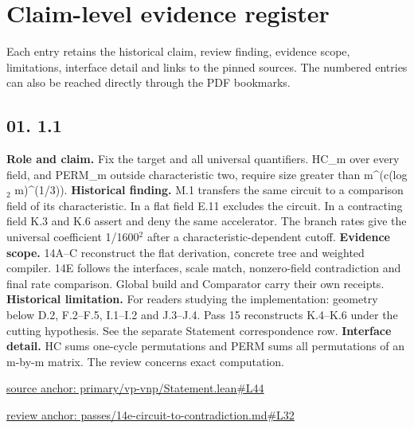 \documentclass[11pt,letterpaper]{article}
\theoremstyle{definition}\newtheorem{definition}[theorem]{Definition}\newtheorem{example}[theorem]{Example}
\theoremstyle{remark}\newtheorem{remark}[theorem]{Remark}
\begin{document}
\section*{Claim-level evidence register}
\noindent Each entry retains the historical claim, review finding, evidence scope, limitations, interface detail and links to the pinned sources. The numbered entries can also be reached directly through the PDF bookmarks.\par\medskip
\goodbreak
{}
\hypertarget{claim.01}{}
\subsection*{01. 1.1}
\textbf{Role and claim.} Fix the target and all universal quantifiers. HC\_m over every field, and PERM\_m outside characteristic two, require size greater than m\textasciicircum{}(c(log\ensuremath{{}_2} m)\textasciicircum{}(1/3)).
\textbf{Historical finding.} M.1 transfers the same circuit to a comparison field of its characteristic. In a flat field E.11 excludes the circuit. In a contracting field K.3 and K.6 assert and deny the same accelerator. The branch rates give the universal coefficient 1/1600\ensuremath{{}^2} after a characteristic-dependent cutoff.
\textbf{Evidence scope.} 14A–C reconstruct the flat derivation, concrete tree and weighted compiler. 14E follows the interfaces, scale match, nonzero-field contradiction and final rate comparison. Global build and Comparator carry their own receipts.
\textbf{Historical limitation.} For readers studying the implementation: geometry below D.2, F.2–F.5, I.1–I.2 and J.3–J.4. Pass 15 reconstructs K.4–K.6 under the cutting hypothesis. See the separate Statement correspondence row.
\textbf{Interface detail.} HC sums one-cycle permutations and PERM sums all permutations of an m-by-m matrix. The review concerns exact computation.
\par\href{https://github.com/nousentllc/VP-VNP-Review/blob/8a7976933b6b2b4ffda1ad3a0dfb5fc6b6f023e8/primary/vp-vnp/Statement.lean\#L44}{source anchor: primary/vp-vnp/Statement.lean\#L44}
\par\href{https://github.com/nousentllc/VP-VNP-Review/blob/8a7976933b6b2b4ffda1ad3a0dfb5fc6b6f023e8/passes/14e-circuit-to-contradiction.md\#L32}{review anchor: passes/14e-circuit-to-contradiction.md\#L32}
\goodbreak
{}
\hypertarget{claim.02}{}
\end{document}
